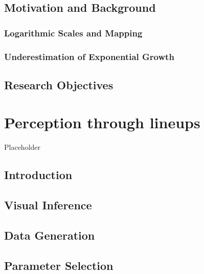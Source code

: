 \documentclass[print]{nuthesis}
\begin{document}
\hypertarget{motivation-and-background}{%
\section{Motivation and Background}\label{motivation-and-background}}

\hypertarget{logarithmic-scales-and-mapping}{%
\subsection{Logarithmic Scales and Mapping}\label{logarithmic-scales-and-mapping}}

\hypertarget{underestimation}{%
\subsection{Underestimation of Exponential Growth}\label{underestimation}}

\hypertarget{research-objectives}{%
\section{Research Objectives}\label{research-objectives}}

\hypertarget{lineups}{%
\chapter{Perception through lineups}\label{lineups}}

Placeholder

\hypertarget{introduction}{%
\section{Introduction}\label{introduction}}

\hypertarget{visual-inference}{%
\section{Visual Inference}\label{visual-inference}}

\hypertarget{data-generation}{%
\section{Data Generation}\label{data-generation}}

\hypertarget{lineups-parameter-selection}{%
\section{Parameter Selection}\label{lineups-parameter-selection}}
\end{document}
